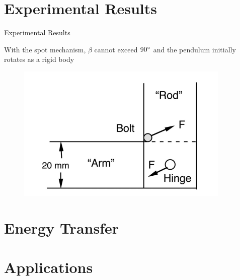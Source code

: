 \documentclass[tikz]{beamer}
\begin{document}
\section{Experimental Results}
\begin{frame} {Experimental Results}
	
	 {
		With the spot mechanism, $\beta$ cannot exceed $90 \degree$ and the pendulum initially rotates as a rigid body
		\begin{figure}
			\centering
			\includegraphics[scale=0.5]{stopmechanism.png}
		\end{figure}
	}

\end{frame}

\section{Energy Transfer}

\section{Applications}

\end{document}

